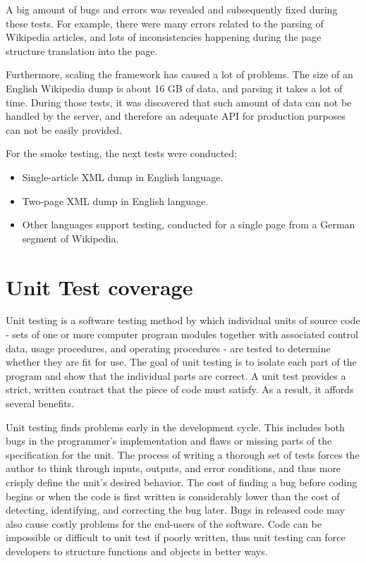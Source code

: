 \documentclass[thesis=M,english,hidelinks]{FITthesis}[2019/12/23]
\begin{document}
A big amount of bugs and errors was revealed and subsequently fixed during these tests. For example, there were many errors related to the parsing of Wikipedia articles, and lots of inconsistencies happening during the page structure translation into the page. 

Furthermore, scaling the framework has caused a lot of problems. The size of an English Wikipedia dump is about 16 GB of data, and parsing it takes a lot of time. During those tests, it was discovered that such amount of data can not be handled by the server, and therefore an adequate API for production purposes can not be easily provided.

For the smoke testing, the next tests were conducted:

\begin{itemize}
	\item Single-article XML dump in English language.
	\item Two-page XML dump in English language.
	\item Other languages support testing, conducted for a single page from a German segment of Wikipedia.
\end{itemize}




\section{Unit Test coverage}

Unit testing is a software testing method by which individual units of source code - sets of one or more computer program modules together with associated control data, usage procedures, and operating procedures - are tested to determine whether they are fit for use. The goal of unit testing is to isolate each part of the program and show that the individual parts are correct. A unit test provides a strict, written contract that the piece of code must satisfy. As a result, it affords several benefits\cite{kh07}.

Unit testing finds problems early in the development cycle. This includes both bugs in the programmer's implementation and flaws or missing parts of the specification for the unit. The process of writing a thorough set of tests forces the author to think through inputs, outputs, and error conditions, and thus more crisply define the unit's desired behavior. The cost of finding a bug before coding begins or when the code is first written is considerably lower than the cost of detecting, identifying, and correcting the bug later. Bugs in released code may also cause costly problems for the end-users of the software. Code can be impossible or difficult to unit test if poorly written, thus unit testing can force developers to structure functions and objects in better ways\cite{bp88}\cite{test_early}\cite{prove_it_works}.
\end{document}
